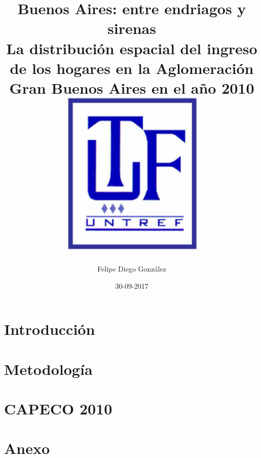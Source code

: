 \documentclass{report}
\title{
	{Buenos Aires: entre endriagos y sirenas}\\
	{\large La distribución espacial del ingreso de los hogares en la Aglomeración Gran Buenos Aires en el año 2010}\\
	{\includegraphics{untrefLogo.jpg}}
}
\author{Felipe Diego González}
\date{30-09-2017}
\begin{document}
  	\maketitle
  	
  	\tableofcontents
  	
  	\chapter{Introducción}
  	

  	\chapter{Metodología}
  	
  	
  	\chapter{CAPECO 2010}
  	

  	\chapter{Anexo}
  		  
  		
	
  		
  	 
  		
  	  	  
  	
  
\end{document}
